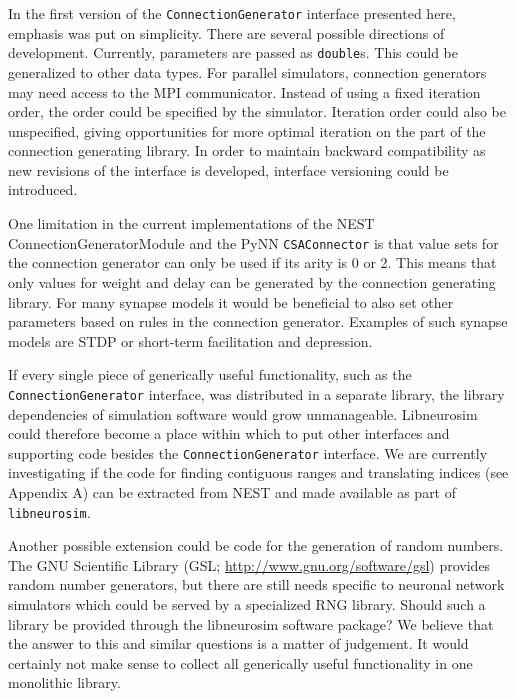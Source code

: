 \documentclass{frontiersSCNS} %
\begin{document}
In the first version of the \verb|ConnectionGenerator| interface
presented here, emphasis was put on simplicity. There are several
possible directions of development. Currently, parameters are passed
as \verb|double|s. This could be generalized to other data types.  For
parallel simulators, connection generators may need access to the MPI
communicator.  Instead of using a fixed iteration order, the order
could be specified by the simulator. Iteration order could also be
unspecified, giving opportunities for more optimal iteration on the
part of the connection generating library.  In order to maintain
backward compatibility as new revisions of the interface is developed,
interface versioning could be introduced.

One limitation in the current implementations of the NEST
ConnectionGeneratorModule and the PyNN \verb|CSAConnector| is that value sets
for the connection generator can only be used if its arity is 0 or
2. This means that only values for weight and delay can be generated
by the connection generating library. For many synapse models it would
be beneficial to also set other parameters based on rules in the
connection generator. Examples of such synapse models are STDP or
short-term facilitation and depression.

If every single piece of generically useful functionality, such as the
\verb|ConnectionGenerator| interface, was distributed in a separate
library, the library dependencies of simulation software would grow
unmanageable.  Libneurosim could therefore become a place within which
to put other interfaces and supporting code besides the
\verb|ConnectionGenerator| interface. We are currently investigating
if the code for finding contiguous ranges and translating indices (see
Appendix A) can be extracted from NEST and made available as part of
\verb|libneurosim|.

Another possible extension could be code for the generation of random
numbers. The GNU Scientific Library (GSL;
\url{http://www.gnu.org/software/gsl}) provides random number
generators, but there are still needs specific to neuronal network
simulators which could be served by a specialized RNG library. Should
such a library be provided through the libneurosim software package?
We believe that the answer to this and similar questions is a matter
of judgement. It would certainly not make sense to collect all
generically useful functionality in one monolithic library.

\end{document}
